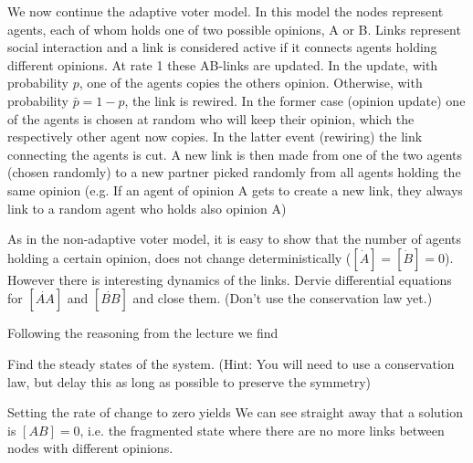 We now continue the adaptive voter model. In this model the nodes represent agents, each of whom holds one of two possible opinions, A or B. Links represent social interaction and a link is considered active if it connects agents holding different opinions. At rate 1 these AB-links 
are updated. In the update, with probability $p$,  one of the agents copies the others opinion. Otherwise, with probability $\bar{p}=1-p$, the link is rewired. In the former case (opinion update) one of the agents is chosen at random who will keep their opinion, which the respectively other agent now copies. In the latter event (rewiring) the link connecting the agents is cut. A new link is then made from one of the two agents (chosen randomly) to a new partner picked randomly from all agents holding the same opinion (e.g. If an agent of opinion A gets to create a new link, they always link to a random agent who holds also opinion A)  

\subquestion 
As in the non-adaptive voter model, it is easy to show that the number of agents holding a certain opinion, does not change deterministically ($[\dot{A}]=[\dot{B}]=0$). However there is interesting dynamics of the links. Dervie differential equations for $[\dot{AA}]$ and $[\dot{BB}]$ and close them. (Don't use the conservation law yet.)

\solution
Following the reasoning from the lecture we find 

\subquestion
Find the steady states of the system. (Hint: You will need to use a conservation law, but delay this as long as possible to preserve the symmetry)

\solution
Setting the rate of change to zero yields 
We can see straight away that a solution is $[AB]=0$, i.e. the fragmented state where there are no more links between nodes with different opinions.

